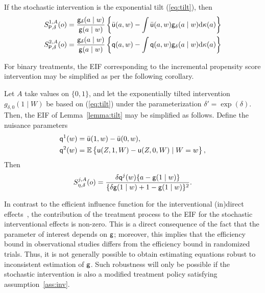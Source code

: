 \begin{lemma}\label{lemma:tilt}
  If the stochastic intervention is the exponential tilt (\ref{eq:tilt}), then
  \begin{align}
    S^{1,A}_{\mathsf{P}, \delta}(o) &= \frac{\mathsf{g}_\delta(a \mid
                                w)}{\mathsf{g}(a \mid w)}\left\{\bar{\mathsf{u}}(a, w) - \int
                                \bar{\mathsf{u}}(a, w)\mathsf{g}_\delta(a\mid
                                w)\mathrm{d}\kappa(a)\right\}\label{eq:scorea1}\\
    S^{2,A}_{\mathsf{P}, \delta}(o) &= \frac{\mathsf{g}_\delta(a \mid
                                w)}{\mathsf{g}(a \mid w)}\left\{\mathsf{q}(a, w) - \int
                                \mathsf{q}(a, w)\mathsf{g}_\delta(a\mid w)
                                \mathrm{d}\kappa(a)\right\}\label{eq:scorea2}
  \end{align}
\end{lemma}

For binary treatments, the EIF corresponding to the incremental propensity score
intervention may be simplified as per the following corollary.
\begin{coro}\label{coro:tilt}
  Let $A$ take values on $\{0, 1\}$, and let the exponentially tilted
  intervention $g_{\delta,0}(1\mid W)$ be based on (\ref{eq:tilt}) under the
  parameterization $\delta' = \exp(\delta)$. Then, the EIF of
  Lemma~\ref{lemma:tilt} may be simplified as follows. Define the nuisance
  parameters
\begin{equation}
  \begin{split}
    \mathsf{q}^1(w) &= \bar{\mathsf{u}}(1, w) - \bar{\mathsf{u}}(0, w),\\
    \mathsf{q}^2(w) &= \mathbb{E} \left\{\mathsf{u}(Z,1, W) - \mathsf{u}(Z,0, W) \mid W = w \right\},
  \end{split}\label{eq:defqs}
\end{equation}
  Then
  $$S^{j,A}_{\eta,\delta}(o)= \frac{\delta\mathsf{q}^j(w)\{a -
  \mathsf{g}(1\mid w)\}}{\{\delta \mathsf{g}(1\mid w) + 1 - \mathsf{g}(1\mid w)\}^2}.$$
\end{coro}

In contrast to the efficient influence function for the interventional
(in)direct effects~\citep{diaz2020nonparametric}, the contribution of the
treatment process to the EIF for the stochastic interventional effects is
non-zero. This is a direct consequence of the fact that the parameter of
interest depends on $\mathsf{g}$; moreover, this implies that the efficiency bound in
observational studies differs from the efficiency bound in randomized trials.
Thus, it is not generally possible to obtain estimating equations robust to
inconsistent estimation of $\mathsf{g}$. Such robustness will only be possible if the
stochastic intervention is also a modified treatment policy satisfying
assumption~\ref{ass:inv}.

